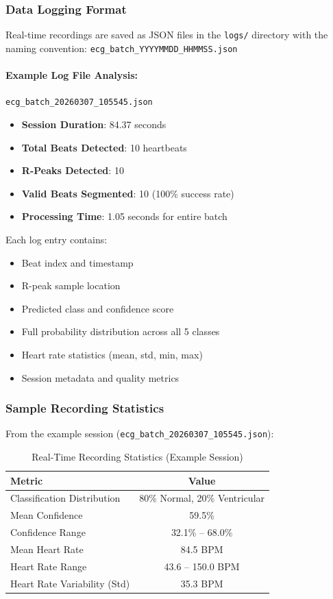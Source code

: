 \documentclass[12pt,a4paper]{article}
\begin{document}
\subsubsection{Data Logging Format}

Real-time recordings are saved as JSON files in the \texttt{logs/} directory with the naming convention: \texttt{ecg\_batch\_YYYYMMDD\_HHMMSS.json}

\paragraph{Example Log File Analysis:} \texttt{ecg\_batch\_20260307\_105545.json}

\begin{itemize}
    \item \textbf{Session Duration}: 84.37 seconds
    \item \textbf{Total Beats Detected}: 10 heartbeats
    \item \textbf{R-Peaks Detected}: 10
    \item \textbf{Valid Beats Segmented}: 10 (100\% success rate)
    \item \textbf{Processing Time}: 1.05 seconds for entire batch
\end{itemize}

Each log entry contains:
\begin{itemize}
    \item Beat index and timestamp
    \item R-peak sample location
    \item Predicted class and confidence score
    \item Full probability distribution across all 5 classes
    \item Heart rate statistics (mean, std, min, max)
    \item Session metadata and quality metrics
\end{itemize}

\subsubsection{Sample Recording Statistics}

From the example session (\texttt{ecg\_batch\_20260307\_105545.json}):

\begin{table}[H]
\centering
\begin{tabular}{@{}lc@{}}
\toprule
\textbf{Metric} & \textbf{Value} \\ 
\midrule
Classification Distribution & 80\% Normal, 20\% Ventricular \\
Mean Confidence & 59.5\% \\
Confidence Range & 32.1\% -- 68.0\% \\
Mean Heart Rate & 84.5 BPM \\
Heart Rate Range & 43.6 -- 150.0 BPM \\
Heart Rate Variability (Std) & 35.3 BPM \\
\bottomrule
\end{tabular}
\caption{Real-Time Recording Statistics (Example Session)}
\label{tab:realtime_stats}
\end{table}
\end{document}
